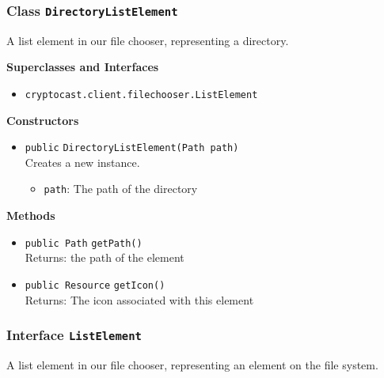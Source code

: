 \subsubsection{Class \lstinline|DirectoryListElement|}
A list element in our file chooser, representing a directory. \\



\textbf{Superclasses and Interfaces}
\begin{itemize}
\item \lstinline|cryptocast.client.filechooser.ListElement|
\end{itemize}



\textbf{Constructors}
\begin{itemize}
\item \lstinline|public| \lstinline|DirectoryListElement|\lstinline|(Path path)|\\
Creates a new instance.
\begin{itemize}
\item \lstinline|path|: The path of the directory
\end{itemize}



\end{itemize}


\textbf{Methods}
\begin{itemize}
\item \lstinline|public Path| \lstinline|getPath|\lstinline|()|\\
Returns: the path of the element



\item \lstinline|public Resource| \lstinline|getIcon|\lstinline|()|\\
Returns: The icon associated with this element



\end{itemize}

\subsubsection{Interface \lstinline|ListElement|}
A list element in our file chooser, representing an element on the file system. \\







